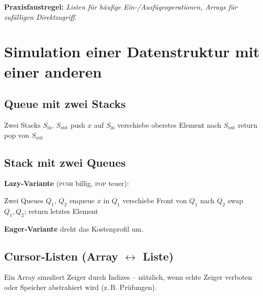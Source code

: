 \vspace{1em}\noindent
\textbf{Praxisfaustregel:} \emph{Listen für häufige Ein-/Ausfügeoperationen,
Arrays für zufälligen Direktzugriff.}

\section{Simulation einer Datenstruktur mit einer anderen}
\subsection*{Queue mit zwei Stacks}
\begin{algorithmic}[H]
\Require Zwei Stacks $S_{\text{in}},\,S_{\text{out}}$
 
    push $x$ auf $S_{\text{in}}$
\EndFunction
{} 
         
            verschiebe oberstes Element nach $S_{\text{out}}$
        \EndWhile
    \EndIf
    return pop von $S_{\text{out}}$
\EndFunction
\end{algorithmic}

\subsection*{Stack mit zwei Queues}
\textbf{Lazy‑Variante} (\textsc{push} billig, \textsc{pop} teuer):
\begin{algorithmic}[H]
\Require Zwei Queues $Q_1,\,Q_2$
    enqueue $x$ in $Q_1$  
\EndFunction
{}
     verschiebe Front von $Q_1$ nach $Q_2$ \EndWhile
    swap $Q_1, Q_2$; return letztes Element 
\EndFunction
\end{algorithmic}
\textbf{Eager‑Variante} dreht das Kostenprofil um.

\subsection*{Cursor‑Listen (Array \texorpdfstring{$\leftrightarrow$}{↔} Liste)}
Ein Array simuliert Zeiger durch Indizes – nützlich, wenn echte Zeiger verboten
oder Speicher abstrahiert wird (z.\,B. Prüfungen).

